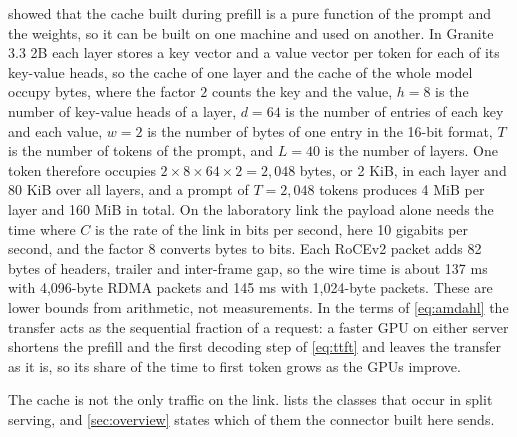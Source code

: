  showed that the cache built during prefill is a pure
function of the prompt and the weights, so it can be built on one machine and
used on another. In Granite 3.3 2B \citep{granite33} each layer stores a
key vector and a value vector per token for each of its key-value heads, so
the cache of one layer and the cache of the whole model occupy
bytes, where the factor $2$ counts the key and the value, $h = 8$ is the
number of key-value heads of a layer, $d = 64$ is the number of entries of
each key and each value, $w = 2$ is the number of bytes of one entry in the
16-bit format, $T$ is the number of tokens of the prompt, and $L = 40$ is the
number of layers. One token therefore occupies
$2 \times 8 \times 64 \times 2 = 2{,}048$ bytes, or 2 KiB, in each layer and
80 KiB over all layers, and a prompt of $T = 2{,}048$ tokens produces 4 MiB
per layer and 160 MiB in total. On the laboratory link the payload alone
needs the time
where $C$ is the rate of the link in bits per second, here 10 gigabits per
second, and the factor $8$ converts bytes to bits.
Each RoCEv2 packet adds 82 bytes of headers, trailer and inter-frame gap, so
the wire time is about 137 ms with 4,096-byte RDMA packets and 145 ms with
1,024-byte packets. These are lower bounds from arithmetic, not measurements.
In the terms of \cref{eq:amdahl} the transfer acts as the sequential fraction
of a request: a faster GPU on either server shortens the prefill and the
first decoding step of \cref{eq:ttft} and leaves the transfer as it is, so
its share of the time to first token grows as the GPUs improve.

The cache is not the only traffic on the link.  lists the
classes that occur in split serving, and \cref{sec:overview} states which of
them the connector built here sends.

